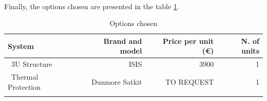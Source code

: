 \paragraph{}Finally, the options chosen are presented in the table \ref{structurefinal}.

\begin{longtable}{| l | r | r | r | }
\hline
\rowcolor[gray]{0.80}	\textbf{System} &  \textbf{Brand and model}     & \textbf{Price per unit (\euro)} & \textbf{N. of units}  \\
\hline
\endfirsthead

	   ~3U Structure & ISIS & 3900 & 1 \\
	   \hline
	   ~Thermal Protection & Dunmore Satkit & TO REQUEST & 1\\
	\hline

\caption{Options chosen}
\label{structurefinal}
\end{longtable}
